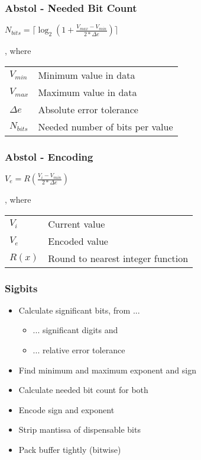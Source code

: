 \documentclass[compress]{beamer}
\begin{document}
\begin{frame}
	\frametitle{Abstol - Needed Bit Count}

	\begin{center}
		$N_{bits}=\lceil\log_2{\left(1 + \frac{V_{max} - V_{min}}{2 * \Delta{e}}\right)}\rceil$
	\end{center}

	\bigskip

	, where\\

	\bigskip

	\begin{tabular}{ll}
		$V_{min}$ & Minimum value in data \\
		$V_{max}$ & Maximum value in data \\
		$\Delta{e}$ & Absolute error tolerance \\
		$N_{bits}$ & Needed number of bits per value
	\end{tabular}

\end{frame}

\begin{frame}
	\frametitle{Abstol - Encoding}

	\begin{center}
		$V_e = R\left(\frac{V_i - V_{min}}{2 * \Delta{e}}\right)$
	\end{center}

	\bigskip

	, where\\

	\bigskip

	\begin{tabular}{ll}
		$V_i$ & Current value \\
		$V_e$ & Encoded value \\
		$R\left(x\right)$ & Round to nearest integer function
	\end{tabular}

\end{frame}

\begin{frame}
	\frametitle{Sigbits}

	\begin{itemize}
		\item Calculate significant bits, from ...
		\begin{itemize}
			\item ... significant digits and
			\item ... relative error tolerance
		\end{itemize}
		\item Find minimum and maximum exponent and sign
		\item Calculate needed bit count for both
		\item Encode sign and exponent
		\item Strip mantissa of dispensable bits
		\item Pack buffer tightly (bitwise)
	\end{itemize}

\end{frame}
\end{document}
